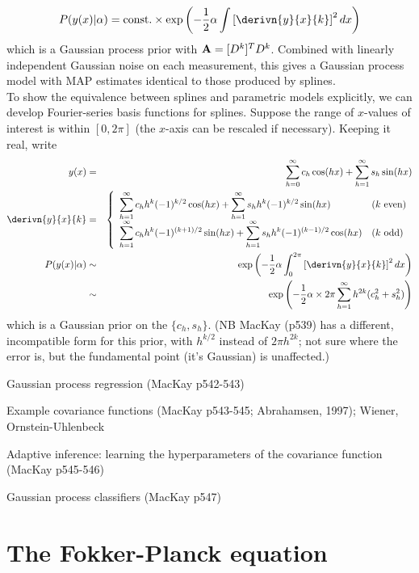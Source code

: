 \documentclass{beamer}
\begin{document}
\begin{frame}{}
\[
P(y(x)|\alpha) = \mbox{const.} \times \exp \left( -\frac{1}{2}\alpha\int \left[ \derivn{y}{x}{k} \right]^2 dx \right)
\]
which is a Gaussian process prior with ${\bf A} = [D^k]^T D^k$.
Combined with linearly independent Gaussian noise on each measurement,
this gives a Gaussian process model with MAP estimates identical to those produced by splines.
\\
To show the equivalence between splines and parametric models explicitly, we can develop Fourier-series basis functions for splines.
Suppose the range of $x$-values of interest is within $[0,2\pi]$ (the $x$-axis can be rescaled if necessary).
Keeping it real, write
\begin{eqnarray*}
y(x) & = & \sum_{h=0}^\infty c_h \cos(hx) + \sum_{h=1}^\infty s_h \sin(hx) \\
\derivn{y}{x}{k} & = & \left\{ \begin{array}{ll}
\displaystyle
\sum_{h=1}^\infty c_h h^k (-1)^{k/2} \cos(hx) + \sum_{h=1}^\infty s_h h^k (-1)^{k/2} \sin(hx) & \mbox{($k$ even)} \\
\displaystyle
\sum_{h=1}^\infty c_h h^k (-1)^{(k+1)/2} \sin(hx) + \sum_{h=1}^\infty s_h h^k (-1)^{(k-1)/2} \cos(hx) & \mbox{($k$ odd)}
\end{array} \right. \\
P(y(x)|\alpha) & \sim & \exp \left( -\frac{1}{2}\alpha\int_0^{2\pi} \left[ \derivn{y}{x}{k} \right]^2 dx \right) \\
& \sim & \exp \left( -\frac{1}{2} \alpha \times 2\pi \sum_{h=1}^{\infty} h^{2k} (c_h^2 + s_h^2) \right)
\end{eqnarray*}
which is a Gaussian prior on the $\{ c_h, s_h \}$.
(NB MacKay (p539) has a different, incompatible form for this prior, with $h^{k/2}$ instead of $2\pi h^{2k}$;
not sure where the error is, but the fundamental point (it's Gaussian) is unaffected.)
\item Gaussian process regression (MacKay p542-543)
\item Example covariance functions (MacKay p543-545; Abrahamsen, 1997); Wiener, Ornstein-Uhlenbeck
\item Adaptive inference: learning the hyperparameters of the covariance function (MacKay p545-546)
\item Gaussian process classifiers (MacKay p547)
\iteme

\end{frame}

\section{The Fokker-Planck equation}
\end{document}
